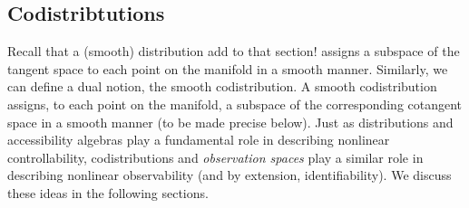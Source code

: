 \documentclass[psamsfonts]{amsart}
\theoremstyle{definition}
\theoremstyle{remark}
\numberwithin{equation}{section}
\begin{document}


  \subsection{Codistribtutions}





Recall that a (smooth) distribution {\color{red}add to that section!} assigns a subspace of the tangent space to each point on the manifold in a smooth manner. Similarly, we can define a dual notion, the smooth codistribution. A smooth codistribution assigns, to each point on the manifold, a subspace of the corresponding cotangent space in a smooth manner (to be made precise below). Just as distributions and accessibility algebras play a fundamental role in describing nonlinear controllability, codistributions and \textit{observation spaces} play a similar role in describing nonlinear observability (and by extension, identifiability). We discuss these ideas in the following sections. 
\end{document}
